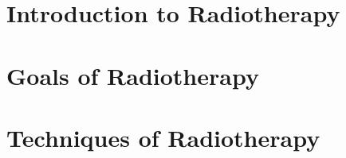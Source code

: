 \section{Introduction to Radiotherapy}

\lipsum[1-6]

\section{Goals of Radiotherapy}

\lipsum[7-12]

\section{Techniques of Radiotherapy}

\lipsum[13-18]